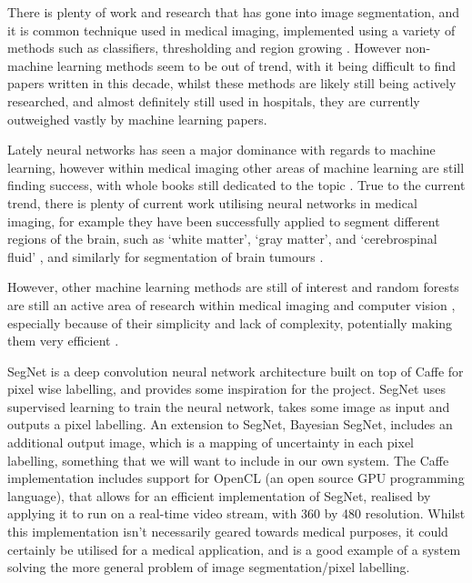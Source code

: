 \documentclass[12pt,twoside,notitlepage]{report}
\begin{document}
        There is plenty of work and research that has gone into image segmentation, and it is common technique used in 
        medical imaging, implemented using a variety of methods such as classifiers, thresholding and region growing
        \cite{pham2000current}. However non-machine learning methods seem to be out of trend, with it being 
        difficult to find papers written in this decade, whilst these methods are likely still being actively 
        researched, and almost definitely still used in hospitals, they are currently outweighed vastly by machine 
        learning papers. 

        Lately neural networks has seen a major dominance with regards to machine learning, however within medical 
        imaging other areas of machine learning are still finding success, with whole books still dedicated to the 
        topic \cite{criminisi2013decision}. True to the current trend, there is plenty of current work utilising 
        neural networks in medical imaging, for example they have been successfully applied to segment different 
        regions of the brain, such as `white matter', `gray matter', and `cerebrospinal fluid' \cite{zhao2016segmenting},
        and similarly for segmentation of brain tumours \cite{zhao2016multiscale}.

        However, other machine learning methods are still of interest and random forests are still an active area of 
        research within medical imaging and computer vision \cite{conjeti2016supervised}, especially because of their 
        simplicity and lack of complexity, potentially making them very efficient \cite{criminisi2012decision}.

        SegNet \cite{badrinarayanan2015segnet2} is a deep convolution neural network architecture built on top of Caffe 
        \cite{jia2014caffe} for pixel wise labelling, and provides some inspiration for the project. SegNet uses 
        supervised learning to train the neural network, takes some image as input and outputs a pixel labelling. An extension 
        to SegNet, Bayesian SegNet, includes an additional output image, which is a mapping of uncertainty in each pixel labelling, 
        something that we will want to include in our own system. The Caffe implementation includes support for OpenCL 
        (an open source GPU programming language), that allows for an efficient implementation of SegNet, realised by 
        applying it to run on a real-time video stream, with 360 by 480 resolution. Whilst this implementation isn't 
        necessarily geared towards medical purposes, it could certainly be utilised for a medical application, and 
        is a good example of a system solving the more general problem of image segmentation/pixel labelling.
\end{document}

